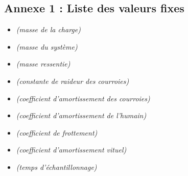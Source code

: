 \documentclass[a4paper,12pt]{article}
\begin{document}
    \subsection{Annexe 1 : Liste des valeurs fixes} \label{Annexe:ValList}
    \begin{itemize}
        \item[]  \textit{(masse de la charge)}
        \item[]  \textit{(masse du système)}
        \item[]  \textit{(masse ressentie)}
        \item[]  \textit{(constante de raideur des courroies)}
        \item[]  \textit{(coefficient d'amortissement des courroies)}
        \item[]  \textit{(coefficient d'amortissement de l'humain)}
        \item[]  \textit{(coefficient de frottement)}
        \item[]  \textit{(coefficient d'amortissement vituel)}
        \item[]  \textit{(temps d'échantillonnage)}
    \end{itemize}
\end{document}
